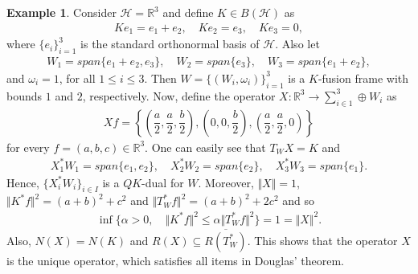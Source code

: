 \documentclass{birkjour}
\theoremstyle{definition}
\newtheorem{ex}[thm]{Example}
\theoremstyle{remark}
\numberwithin{equation}{section}
\begin{document}
\begin{ex}\label{example002}
Consider $\mathcal{H} = \mathbb{R}^{3}$ and  define $K\in B(\mathcal{H})$
as\begin{eqnarray*}
Ke_{1} = e_{1}+e_{2}, \quad Ke_{2} = e_{3}, \quad Ke_{3} = 0,
\end{eqnarray*}
where $\lbrace e_{i}\rbrace_{i=1}^{3}$ is the standard orthonormal basis of
$\mathcal{H}$. Also let
\begin{eqnarray*}
W_{1} = \textit{span}\lbrace e_{1}+e_{2}, e_{3}\rbrace, \quad W_{2} = \textit{span}\lbrace e_{3}\rbrace, \quad W_{3} = \textit{span}\lbrace e_{1}+e_{2}\rbrace,
\end{eqnarray*}
and $\omega_{i}=1$, for all $1 \leq i\leq 3$. Then $W=\lbrace (W_{i},
\omega_{i})\rbrace_{i=1}^{3}$ is a $K$-fusion frame with bounds $1$ and $2$,
respectively. Now, define  the operator $X:\mathbb{R}^{3}\rightarrow \sum_{i\in 1}^{3}\oplus W_{i}$ as
\begin{eqnarray*}
Xf= \left\{\left(\dfrac{a}{2}, \dfrac{a}{2}, \dfrac{b}{2}\right), \left(0, 0, \dfrac{b}{2}\right), \left(\dfrac{a}{2}, \dfrac{a}{2}, 0\right)   \right\}
\end{eqnarray*}
for every $f=(a,b,c)\in \mathbb{R}^{3}$. One can easily see that $T_{W}X=K$ and
\begin{eqnarray*}
X_{1}^{*}W_{1}=\textit{span}\lbrace e_{1}, e_{2}\rbrace, \quad
X_{2}^{*}W_{2}=  \textit{span}\lbrace e_{2}\rbrace, \quad
X_{3}^{*}W_{3}=  \textit{span}\lbrace e_{1}\rbrace.
\end{eqnarray*}
Hence, $\{X_{i}^{*}W_{i}\}_{i\in I}$ is a  $QK$-dual for $W$. Moreover, $\Vert X\Vert=1$, $\Vert K^{*}f\Vert^{2}=(a+b)^{2}+c^{2}$ and $\Vert T_{W}^{*}f\Vert^{2}=(a+b)^{2}+2c^{2}$ and so 
\begin{eqnarray*}
\inf \{\alpha>0,\quad \Vert K^{*}f\Vert ^{2}\leq \alpha\Vert T_{W}^{*}f\Vert ^{2}\}=1=\Vert X\Vert^{2}.
\end{eqnarray*}
 Also, $N(X)=N(K)$ and $R(X)\subseteq \overline{R(T_{W}^{*})}$. This shows that the operator $X$ is the unique operator, which satisfies all items in Douglas' theorem. 
\end{ex}
\end{document}
